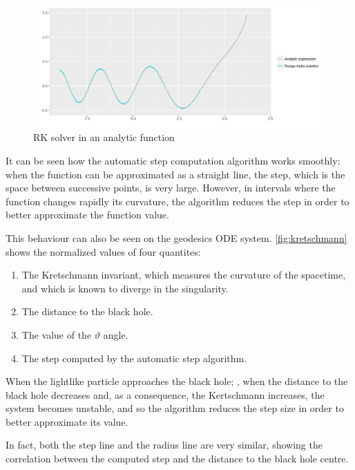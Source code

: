 \begin{figure}[bth]
	\myfloatalign
	\includegraphics[width=\linewidth]{gfx/analytic}
	\caption[\ac{RK} solver in an analytic function]{\ac{RK} solver in an analytic function}
	\label{fig:stepsize}
\end{figure}

It can be seen how the automatic step computation algorithm works smoothly: when the function can be approximated as a straight line, the step, which is the space between successive points, is very large. However, in intervals where the function changes rapidly its curvature, the algorithm reduces the step in order to better approximate the function value.

This behaviour can also be seen on the geodesics \ac{ODE} system. \autoref{fig:kretschmann} shows the normalized values of four quantites:
\begin{enumerate}
	\item The Kretschmann invariant, which measures the curvature of the spacetime, and which is known to diverge in the singularity.
	\item The distance to the black hole.
	\item The value of the $\vartheta$ angle.
	\item The step computed by the automatic step algorithm.
\end{enumerate}

When the lightlike particle approaches the black hole; \ie, when the distance to the black hole decreases and, as a consequence, the Kertschmann increases, the system becomes unstable, and so the algorithm reduces the step size in order to better approximate its value.

In fact, both the step line and the radius line are very similar, showing the correlation between the computed step and the distance to the black hole centre.

